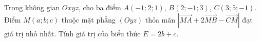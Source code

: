 \begin{ex}
Trong không gian $Oxyz$, cho ba điểm $A(-1;2;1)$, $B(2;-1;3)$, $C(3;5;-1)$. Điểm $M(a;b;c)$ thuộc mặt phẳng $(Oyz)$ thỏa mãn $\left|\overrightarrow{MA}+2\overrightarrow{MB}-\overrightarrow{CM}\right|$ đạt giá trị nhỏ nhất. Tính giá trị của biểu thức $E=2b+c$.
\end{ex}
